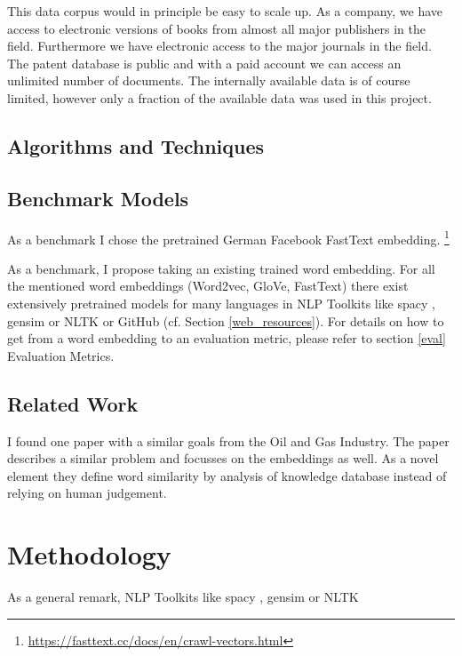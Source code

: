 \documentclass[10pt,a4paper]{article}
\begin{document}
	This data corpus would in principle be easy to scale up. As a company, we have access to electronic versions of books from almost all major publishers in the field. Furthermore we have electronic access to the major journals in the field. The patent database is public and with a paid account we can access an unlimited number of documents.
	The internally available data is of course limited, however only a fraction of the available data was used in this project.      
	 
    \subsection{Algorithms and Techniques}
    \subsection{Benchmark Models}
    As a benchmark I chose the pretrained German Facebook FastText embedding.  \footnote{\url{https://fasttext.cc/docs/en/crawl-vectors.html}}
    
    As a benchmark, I propose taking an existing trained word embedding. For all the mentioned word embeddings (Word2vec, GloVe, FastText) there exist extensively pretrained models for many languages in NLP Toolkits like spacy \cite{spacy2}, gensim \cite{rehurek_lrec} or NLTK \cite{Loper:2002:NNL:1118108.1118117} or GitHub (cf. Section \ref{web_resources}). For details on how to get from a word embedding to an evaluation metric, please refer to section \ref{eval} Evaluation Metrics.
    
	\subsection{Related Work}

    I found one paper with a similar goals \cite{OilandGas} from the Oil and Gas Industry. The paper describes a similar problem and focusses on the embeddings as well. As a novel element they define word similarity by analysis of knowledge database instead of relying on human judgement.
			
	\section{Methodology}
	As a general remark,  NLP Toolkits like spacy \cite{spacy2}, gensim \cite{rehurek_lrec} or NLTK \cite{Loper:2002:NNL:1118108.1118117}
	
	
\end{document}
